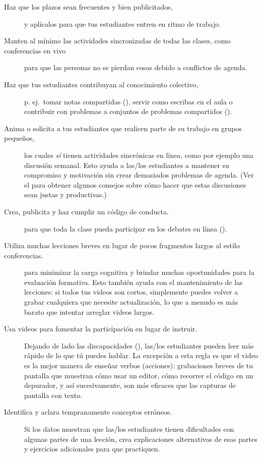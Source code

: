 \begin{description}

\item[Haz que los plazos sean frecuentes y bien publicitados,]
  y aplícalos para que tus estudiantes entren en ritmo de trabajo.

\item[Manten al mínimo las actividades sincronizadas de todas las clases, como conferencias en vivo]
  para que las personas no se pierdan cosas debido a conflictos de agenda.

\item[Haz que tus estudiantes contribuyan al conocimiento colectivo,]
  p. ej.\ tomar notas compartidas (),
  servir como escribas en el aula
  o contribuir con problemas a conjuntos de problemas compartidos ().

\item[Anima o solicita a tus estudiantes que realicen parte de su trabajo en grupos pequeños,]
  los cuales \emph{sí} tienen actividades sincrónicas en línea, como por ejemplo una discusión semanal.
  Esto ayuda a las/los estudiantes a mantener su compromiso y motivación sin crear demasiados problemas de agenda.
  (Ver el  para obtener algunos consejos sobre cómo hacer que estas discusiones sean justas y productivas.)

\item[Crea, publicita y haz cumplir un código de conducta.]
  para que toda la clase pueda participar en los debates en línea ().

\item[Utiliza muchas lecciones breves en lugar de pocos fragmentos largos al estilo conferencias.]
  para minimizar la carga cognitiva
  y brindar muchas oportunidades para la evaluación formativa.
  Esto también ayuda con el mantenimiento de las lecciones:
  si todos tus videos son cortos,
  simplemente puedes volver a grabar cualquiera que necesite actualización,
  lo que a menudo es más barato que intentar arreglar videos largos.

\item[Usa videos para fomentar la participación en lugar de instruir.]
  Dejando de lado las discapacidades (),
  las/los estudiantes pueden leer más rápido de lo que tú puedes hablar.
  La excepción a esta regla es que
  el video es la mejor manera de enseñar verbos (acciones):
  grabaciones breves de tu pantalla que muestran cómo usar un editor,
  cómo recorrer el código en un depurador,
  y así sucesivamente, son más eficaces que las capturas de pantalla con texto.

\item[Identifica y aclara tempranamente conceptos erróneos.]
  Si los datos muestran que las/los estudiantes tienen dificultades con algunas partes de una lección,
  crea explicaciones alternativas de esas partes
  y ejercicios adicionales para que practiquen.

\end{description}

